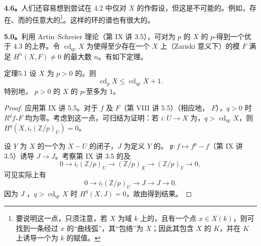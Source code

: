 \textbf{4.6。}人们还容易想到尝试在 4.2 中仅对 $X$ 的作假设，但这是不可能的。例如，存在、而的任意大的\footnote{要说明这一点，只须注意，若 $X$ 为域 $k$ 上的，且有一个点 $x\in X(k)$，则可找到一条经过 $x$ 的“曲线弧”，其“包络”为 $X$；因此其包含 $X$ 的 $K$，并在 $K$ 上诱导一个为 $k$ 的赋值。}。这样的环的谱也有很大的。

\textbf{5.0。}利用 Artin--Schreier 理论（第 IX 讲 3.5），可对为 $p$ 的 $X$ 的 $p$-得到一个优于 4.3 的上界。令 $\operatorname{cd}_{\mathrm{qc}}X$ 为使得至少存在一个 $X$ 上（Zariski 意义下）的模 $F$ 满足 $H^n(X,F)\ne0$ 的最大数 $n$。有如下定理。
\begin{SGAresult}{定理}{5.1}
设 $X$ 为 $p>0$ 的。则
\[
 \operatorname{cd}_pX\leq\operatorname{cd}_{\mathrm{qc}}X+1.
\]
特别地， $p>0$ 的 $X$ 的 $p$-至多为 $1$。
\end{SGAresult}
\begin{proof}
应用第 IX 讲 5.5。对于 $f$ 及 $F$（第 VIII 讲 5.5）（相应地， $F$），$q>0$ 时 $R^qf_*F$ 均为零。考虑到这一点，可归结为证明：若 $i:U\to X$ 为，$q>\operatorname{cd}_{\mathrm{qc}}X$，则 $H^q(X,i_!(\mathbb Z/p)_U)=0$。

设 $Y$ 为 $X$ 的一个为 $X-U$ 的闭子，$J$ 为定义 $Y$ 的。 $\mathfrak p:f\mapsto f^p-f$（第 IX 讲 3.5）诱导 $J\to J$。考察第 IX 讲 3.5 的及
\[
 0\longrightarrow i_!(\mathbb Z/p)_U\longrightarrow(\mathbb Z/p)_X\longrightarrow(\mathbb Z/p)_Y\longrightarrow0,
\]
可见实际上有
\begin{equation}
 0\longrightarrow i_!(\mathbb Z/p)_U\longrightarrow J\longrightarrow J\longrightarrow0.\tag{*}
\end{equation}
因为 $J$ ，$q>\operatorname{cd}_{\mathrm{qc}}X$ 时 $H^q(X,J)=0$，故由得到结果。
\end{proof}
